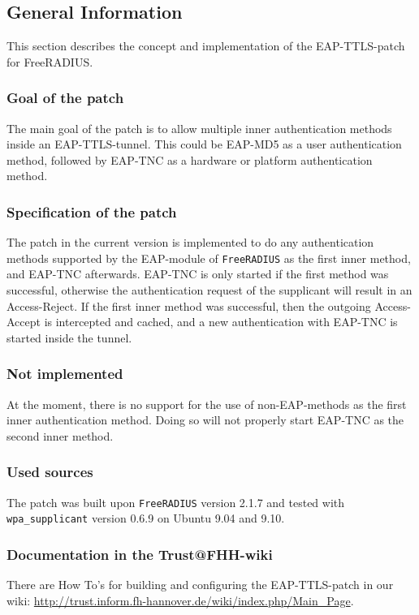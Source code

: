 \subsection{General Information}
This section describes the concept and implementation of the EAP-TTLS-patch for FreeRADIUS.

\subsubsection*{Goal of the patch}
The main goal of the patch is to allow multiple inner authentication methods inside an EAP-TTLS-tunnel.
This could be EAP-MD5 as a user authentication method, followed by EAP-TNC as a hardware or platform authentication method.

\subsubsection*{Specification of the patch}
The patch in the current version is implemented to do any authentication methods supported by the EAP-module of \texttt{FreeRADIUS} as the first inner method, and EAP-TNC afterwards.
EAP-TNC is only started if the first method was successful, otherwise the authentication request of the supplicant will result in an Access-Reject.
If the first inner method was successful, then the outgoing Access-Accept is intercepted and cached, and a new authentication with EAP-TNC is started inside the tunnel.

\subsubsection*{Not implemented}
At the moment, there is no support for the use of non-EAP-methods as the first inner authentication method.
Doing so will not properly start EAP-TNC as the second inner method.

\subsubsection*{Used sources}
The patch was built upon \texttt{FreeRADIUS} version 2.1.7 and tested with \texttt{wpa\_supplicant} version 0.6.9 on Ubuntu 9.04 and 9.10.

\subsubsection*{Documentation in the Trust@FHH-wiki}
There are How To's for building and configuring the EAP-TTLS-patch in our wiki: \url{http://trust.inform.fh-hannover.de/wiki/index.php/Main_Page}.
